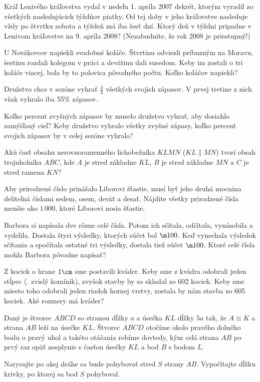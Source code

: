 {%
Kráľ Lenivého kráľovstva vydal v nedeľu 1. apríla 2007 dekrét, ktorým vyradil zo
všetkých nasledujúcich týždňov piatky. Od tej doby v jeho kráľovstve nasleduje vždy
po štvrtku sobota a týždeň má iba šesť dní. Ktorý deň v týždni pripadne v Lenivom
kráľovstve na 9. apríla 2008?
(Nezabudnite, že rok 2008 je priestupný!)}

{%
U Novákovcov napiekli svadobné koláče. Štvrtinu odviezli príbuzným na Moravu,
šestinu rozdali kolegom v práci a devätinu dali susedom. Keby im zostali o tri koláče
viacej, bola by to polovica pôvodného počtu. Koľko koláčov napiekli?}

{%
Družstvo chce v sezóne vyhrať $\frac34$ všetkých svojich zápasov. V prvej tretine z nich
však vyhralo iba 55\% zápasov.
\begin{itemize}
 Koľko percent zvyšných zápasov by muselo družstvo vyhrať, aby dosiahlo
zamýšľaný cieľ?
 Keby družstvo vyhralo všetky zvyšné zápasy, koľko percent svojich zápasov by
v celej sezóne vyhralo?
\end{itemize}
}

{%
Akú časť obsahu nerovnoramenného lichobežníka $KLMN$ ($KL\parallel MN$) tvorí obsah
trojuholníka $ABC$, kde $A$ je stred základne $KL$, $B$ je stred základne $MN$ a $C$ je stred
ramena $KN$?}

{%
Aby prirodzené číslo prinášalo Liborovi šťastie, musí byť jeho druhá mocnina
deliteľná číslami sedem, osem, deväť a desať. Nájdite všetky prirodzené čísla menšie
ako $1\,000$, ktoré Liborovi nosia šťastie.}

{%
Barbora si napísala dve rôzne celé čísla. Potom ich sčítala, odčítala, vynásobila a vydelila. Dostala štyri výsledky, ktorých súčet bol $\m100$. Keď vynechala výsledok sčítania a spočítala ostatné tri výsledky, dostala tiež súčet $\m100$. Ktoré celé čísla mohla Barbora pôvodne napísať?}

{%
Z kociek o hrane $1\cm$ sme postavili kváder. Keby sme z kvádra odobrali jeden stĺpec (\tj. zvislý komínik), zvyšok stavby by sa skladal zo 602 kociek. Keby sme miesto toho odobrali jeden riadok hornej vrstvy, zostala by nám stavba zo 605 kociek. Aké rozmery má kváder?}

{%
Daný je štvorec $ABCD$ so stranou dĺžky $a$ a úsečka $KL$ dĺžky $5a$ tak, že $A\equiv K$ a strana $AB$ leží na úsečke $KL$. Štvorec $ABCD$ otočíme okolo pravého dolného bodu o pravý uhol a takéto otáčania robíme dovtedy, kým celá strana $AB$ po prvý raz opäť nesplynie s časťou úsečky $KL$ a bod $B$ s bodom $L$.
\begin{itemize}
 Narysujte po akej dráhe sa bude pohybovať stred $S$ strany $AB$.
 Vypočítajte dĺžku krivky, po ktorej sa bod $S$ pohyboval.
\end{itemize}
}

